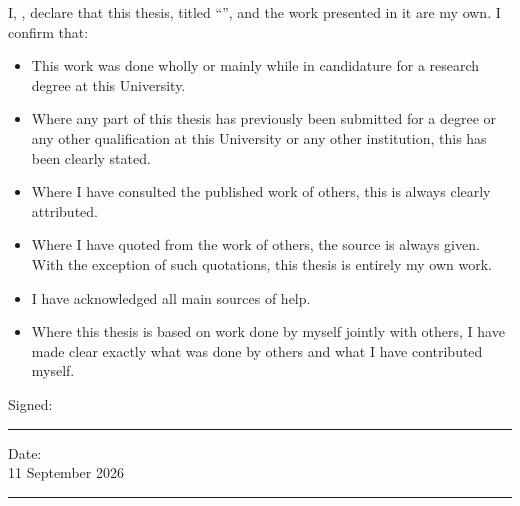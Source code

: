 \documentclass[
12pt,
oneside,
english,
onehalfspacing,
nolistspacing,
parskip,
headsepline,
]{MastersDoctoralThesis}
\newcommand{\thesisdate}{11 September 2026}
\begin{document}
\begin{declaration}
\addchaptertocentry{\authorshipname}
\noindent I, \authorname, declare that this thesis, titled \enquote{\ttitle}, and the work presented in it are my own. I confirm that:

\begin{itemize}
\item This work was done wholly or mainly while in candidature for a research degree at this University.
\item Where any part of this thesis has previously been submitted for a degree or any other qualification at this University or any other institution, this has been clearly stated.
\item Where I have consulted the published work of others, this is always clearly attributed.
\item Where I have quoted from the work of others, the source is always given. With the exception of such quotations, this thesis is entirely my own work.
\item I have acknowledged all main sources of help.
\item Where this thesis is based on work done by myself jointly with others, I have made clear exactly what was done by others and what I have contributed myself.
\end{itemize}

\noindent Signed:\\
\rule{25em}{0.5pt}

\noindent Date:\\
\thesisdate\\[-0.4em]
\rule{25em}{0.5pt}
\end{declaration}

\cleardoublepage

\end{document}
